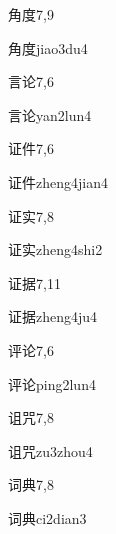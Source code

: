 \begin{entry}{角度}{7,9}
  \begin{phonetics}{角度}{jiao3du4}
  \end{phonetics}
\end{entry}

\begin{entry}{言论}{7,6}
  \begin{phonetics}{言论}{yan2lun4}
  \end{phonetics}
\end{entry}

\begin{entry}{证件}{7,6}
  \begin{phonetics}{证件}{zheng4jian4}
  \end{phonetics}
\end{entry}

\begin{entry}{证实}{7,8}
  \begin{phonetics}{证实}{zheng4shi2}
  \end{phonetics}
\end{entry}

\begin{entry}{证据}{7,11}
  \begin{phonetics}{证据}{zheng4ju4}
  \end{phonetics}
\end{entry}

\begin{entry}{评论}{7,6}
  \begin{phonetics}{评论}{ping2lun4}
  \end{phonetics}
\end{entry}

\begin{entry}{诅咒}{7,8}
  \begin{phonetics}{诅咒}{zu3zhou4}
  \end{phonetics}
\end{entry}

\begin{entry}{词典}{7,8}
  \begin{phonetics}{词典}{ci2dian3}
  \end{phonetics}
\end{entry}

